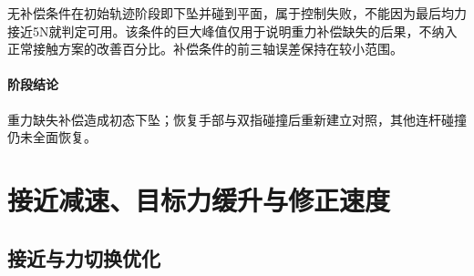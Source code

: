 无补偿条件在初始轨迹阶段即下坠并碰到平面，属于控制失败，不能因为最后均力接近5N就判定可用。该条件的巨大峰值仅用于说明重力补偿缺失的后果，不纳入正常接触方案的改善百分比。补偿条件的前三轴误差保持在较小范围。



\paragraph{阶段结论}重力缺失补偿造成初态下坠；恢复手部与双指碰撞后重新建立对照，其他连杆碰撞仍未全面恢复。


\FloatBarrier

\section{接近减速、目标力缓升与修正速度}

\label{stage:s14}

\subsection{接近与力切换优化}\label{s14-detail-1}

